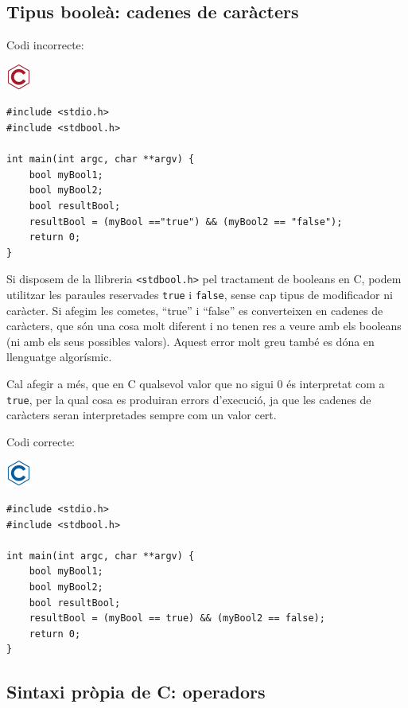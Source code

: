 \documentclass[
]{book}
\begin{document}
\hypertarget{tipus-booleuxe0-cadenes-de-caruxe0cters}{%
\subsection{Tipus booleà: cadenes de caràcters}\label{tipus-booleuxe0-cadenes-de-caruxe0cters}}

Codi incorrecte:

\includegraphics{./img/c_err.png}

\begin{verbatim}
#include <stdio.h>
#include <stdbool.h>

int main(int argc, char **argv) {
    bool myBool1;
    bool myBool2;
    bool resultBool;
    resultBool = (myBool =="true") && (myBool2 == "false");
    return 0;
}
\end{verbatim}

Si disposem de la llibreria \texttt{\textless{}stdbool.h\textgreater{}} pel tractament de booleans en C, podem utilitzar les paraules reservades \texttt{true} i \texttt{false}, sense cap tipus de modificador ni caràcter. Si afegim les cometes, ``true'' i ``false'' es converteixen en cadenes de caràcters, que són una cosa molt diferent i no tenen res a veure amb els booleans (ni amb els seus possibles valors). Aquest error molt greu també es dóna en llenguatge algorísmic.

Cal afegir a més, que en C qualsevol valor que no sigui 0 és interpretat com a \texttt{true}, per la qual cosa es produiran errors d'execució, ja que les cadenes de caràcters seran interpretades sempre com un valor cert.

Codi correcte:

\includegraphics{./img/c.png}

\begin{verbatim}
#include <stdio.h>
#include <stdbool.h>

int main(int argc, char **argv) {
    bool myBool1;
    bool myBool2;
    bool resultBool;
    resultBool = (myBool == true) && (myBool2 == false);
    return 0;
}
\end{verbatim}

\hypertarget{sintaxi-pruxf2pia-de-c-operadors}{%
\subsection{Sintaxi pròpia de C: operadors}\label{sintaxi-pruxf2pia-de-c-operadors}}
\end{document}
